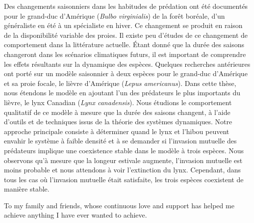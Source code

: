 \documentclass[12pt]{UOthesis}
\theoremstyle{remarkstyle}
\begin{document}
Des changements saisonniers dans les habitudes de pr\'edation ont \'et\'e document\'es pour le grand-duc d'Am\'erique (\textit{Bulbo virginialis}) de la for\^{e}t bor\'eale, d'un g\'en\'eraliste en \'et\'e \`a un sp\'ecialiste en hiver. Ce changement se produit en raison de la disponibilit\'e variable des proies. Il existe peu d'\'etudes de ce changement de comportement dans la litt\'erature actuelle. \'Etant donn\'e que la dur\'ee des saisons changeront dans les sc\'enarios climatiques futurs, il est important de comprendre les effets r\'esultants sur la dynamique des esp\`eces. Quelques recherches ant\'erieures ont port\'e sur un mod\`ele saisonnier \`a deux esp\`eces pour le grand-duc d'Am\'erique et sa proie focale, le li\`evre d'Am\'erique (\textit{Lepus americanus}). Dans cette th\`ese, nous \'etendons le mod\`ele en ajoutant l'un des pr\'edateurs le plus importants du li\`evre, le lynx Canadian (\textit{Lynx canadensis}). Nous \'etudions le comportement qualitatif de ce mod\`ele \`a mesure que la dur\'ee des saisons changent, \`a l'aide d'outils et de techniques issus de la th\'eorie des syst\`emes dynamiques. Notre approche principale consiste \`a d\'eterminer quand le lynx et l'hibou peuvent envahir le syst\`eme \`a faible densit\'e et \`a se demander si l'invasion mutuelle des pr\'edateurs implique une coexistence stable dans le mod\`ele \`a trois esp\`eces. Nous observons qu'\`a mesure que la longeur estivale augmente, l'invasion mutuelle est moins probable et nous attendons \`a voir l'extinction du lynx. Cependant, dans tous les cas o\`u l'invasion mutuelle \'etait satisfaite, les trois esp\`eces coexistent de mani\`ere stable.

\cleardoublepage


To my family and friends, whose continuous love and support has helped me achieve anything I have ever wanted to achieve.

\cleardoublepage
\end{document}
